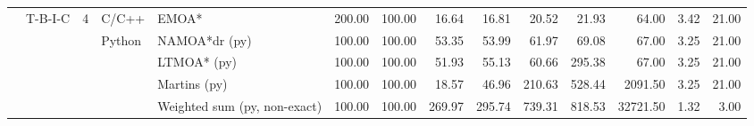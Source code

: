 \begin{table}
\begin{tabular}{lllllrrrrrrrrr}
\cline{2-14} \cline{3-14} \cline{4-14}
 & \multirow[t]{5}{*}{T-B-I-C} & \multirow[t]{5}{*}{4} & C/C++ & EMOA* & 200.00 & 100.00 & 16.64 & 16.81 & 20.52 & 21.93 & 64.00 & 3.42 & 21.00 \\
\cline{4-14}
 &  &  & \multirow[t]{4}{*}{Python} & NAMOA*dr (py) & 100.00 & 100.00 & 53.35 & 53.99 & 61.97 & 69.08 & 67.00 & 3.25 & 21.00 \\
 &  &  &  & LTMOA* (py) & 100.00 & 100.00 & 51.93 & 55.13 & 60.66 & 295.38 & 67.00 & 3.25 & 21.00 \\
 &  &  &  & Martins (py) & 100.00 & 100.00 & 18.57 & 46.96 & 210.63 & 528.44 & 2091.50 & 3.25 & 21.00 \\
 &  &  &  & Weighted sum (py, non-exact) & 100.00 & 100.00 & 269.97 & 295.74 & 739.31 & 818.53 & 32721.50 & 1.32 & 3.00 \\
\cline{1-14} \cline{2-14} \cline{3-14} \cline{4-14}
\bottomrule
\end{tabular}
\end{table}

